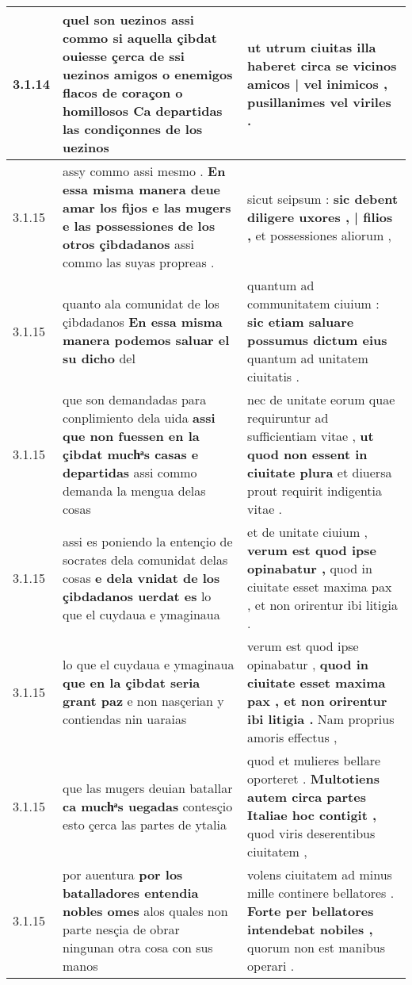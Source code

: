 \begin{tabular}{|p{1cm}|p{6.5cm}|p{6.5cm}|}
3.1.14 & quel son uezinos assi commo si aquella çibdat ouiesse çerca \textbf{ de ssi uezinos amigos o enemigos flacos de coraçon o homillosos } Ca departidas las condiçonnes de los uezinos & ut utrum ciuitas illa haberet \textbf{ circa se vicinos amicos | vel inimicos , } pusillanimes vel viriles . \\\hline
3.1.15 & assy commo assi mesmo . \textbf{ En essa misma manera deue amar los fijos e las mugers e las possessiones de los otros çibdadanos } assi commo las suyas propreas . & sicut seipsum : \textbf{ sic debent diligere uxores , | filios , } et possessiones aliorum , \\\hline
3.1.15 & quanto ala comunidat de los çibdadanos \textbf{ En essa misma manera podemos saluar el su dicho } del & quantum ad communitatem ciuium : \textbf{ sic etiam saluare possumus dictum eius } quantum ad unitatem ciuitatis . \\\hline
3.1.15 & que son demandadas para conplimiento dela uida \textbf{ assi que non fuessen en la çibdat muchͣs casas e departidas } assi commo demanda la mengua delas cosas & nec de unitate eorum quae requiruntur ad sufficientiam vitae , \textbf{ ut quod non essent in ciuitate plura } et diuersa prout requirit indigentia vitae . \\\hline
3.1.15 & assi es poniendo la entençio de socrates dela comunidat delas cosas \textbf{ e dela vnidat de los çibdadanos uerdat es } lo que el cuydaua e ymaginaua & et de unitate ciuium , \textbf{ verum est quod ipse opinabatur , } quod in ciuitate esset maxima pax , et non orirentur ibi litigia . \\\hline
3.1.15 & lo que el cuydaua e ymaginaua \textbf{ que en la çibdat seria grant paz } e non nasçerian y contiendas nin uaraias & verum est quod ipse opinabatur , \textbf{ quod in ciuitate esset maxima pax , et non orirentur ibi litigia . } Nam proprius amoris effectus , \\\hline
3.1.15 & que las mugers deuian batallar \textbf{ ca muchͣs uegadas } contesçio esto çerca las partes de ytalia & quod et mulieres bellare oporteret . \textbf{ Multotiens autem circa partes Italiae hoc contigit , } quod viris deserentibus ciuitatem , \\\hline
3.1.15 & por auentura \textbf{ por los batalladores entendia nobles omes } alos quales non parte nesçia de obrar ningunan otra cosa con sus manos & volens ciuitatem ad minus mille continere bellatores . \textbf{ Forte per bellatores intendebat nobiles , } quorum non est manibus operari . \\\hline

\end{tabular}
